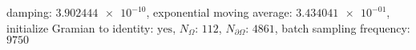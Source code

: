 damping: $\num[scientific-notation=true]{3.902444e-10}$, exponential moving average: $\num[scientific-notation=true]{3.434041e-01}$, initialize Gramian to identity: $\text{yes}$, $N_{\Omega}$: $\num[scientific-notation=false]{112}$, $N_{\partial\Omega}$: $\num[scientific-notation=false]{4861}$, batch sampling frequency: $\num[scientific-notation=false]{9750}$